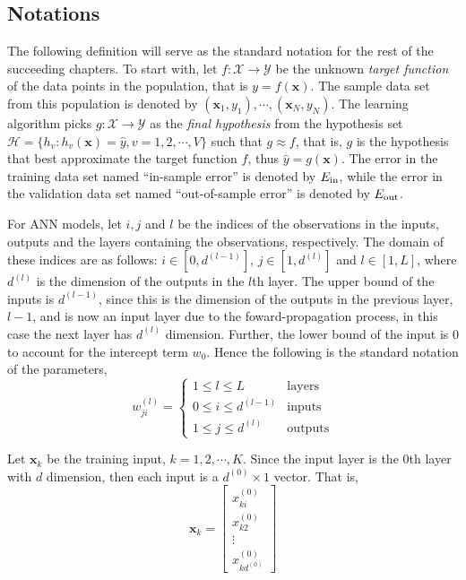 \subsection{Notations}
The following definition will serve as the standard notation for the rest of the succeeding chapters. To start with, let $f:\mathcal{X}\to\mathcal{Y}$ be the unknown \textit{target function} of the data points in the population, that is $y=f(\mathbf{x})$. The sample data set from this population is denoted by $(\mathbf{x}_1,y_1),\cdots,(\mathbf{x}_N,y_N)$. The learning algorithm picks $g:\mathcal{X}\to \mathcal{Y}$ as the \textit{final hypothesis} from the hypothesis set $\mathscr{H}=\{h_v:h_v(\mathbf{x})=\hat{y},v=1,2,\cdots,V\}$ such that $g\approx f$, that is, $g$ is the hypothesis that best approximate the target function $f$, thus $\hat{y}=g(\mathbf{x})$. The error in the training data set named ``in-sample error'' is denoted by $E_{\mathrm{in}}$, while the error in the validation data set named ``out-of-sample error'' is denoted by $E_{\mathrm{out}}$.

For ANN models, let $i, j$ and $l$ be the indices of the observations in the inputs, outputs and the layers containing the observations, respectively. The domain of these indices are as follows: $i\in[0,d^{(l-1)}]$, $j\in[1,d^{(l)}]$ and $l\in[1,L]$, where $d^{(l)}$ is the dimension of the outputs in the $l$th layer. The upper bound of the inputs is $d^{(l-1)}$, since this is the dimension of the outputs in the previous layer, $l-1$, and is now an input layer due to the foward-propagation process, in this case the next layer has $d^{(l)}$ dimension. Further, the lower bound of the input is 0 to account for the intercept term $w_0$. Hence the following is the standard notation of the parameters,
$$
w_{ji}^{(l)}=\begin{cases}
1\leq l \leq L&\mathrm{layers}\\
0\leq i\leq d^{(l-1)}&\mathrm{inputs}\\
1\leq j\leq d^{(l)}&\mathrm{outputs}
\end{cases}
$$

Let $\mathbf{x}_k$ be the training input, $k=1,2,\cdots,K$. Since the input layer is the $0$th layer with $d$ dimension, then each input is a $d^{(0)}\times 1$ vector. That is,
$$
\mathbf{x}_k=\left[
\begin{array}{c}
x_{ki}^{(0)}\\
x_{k2}^{(0)}\\
\vdots\\
x_{kd^{(0)}}^{(0)}
\end{array}
\right]
$$

